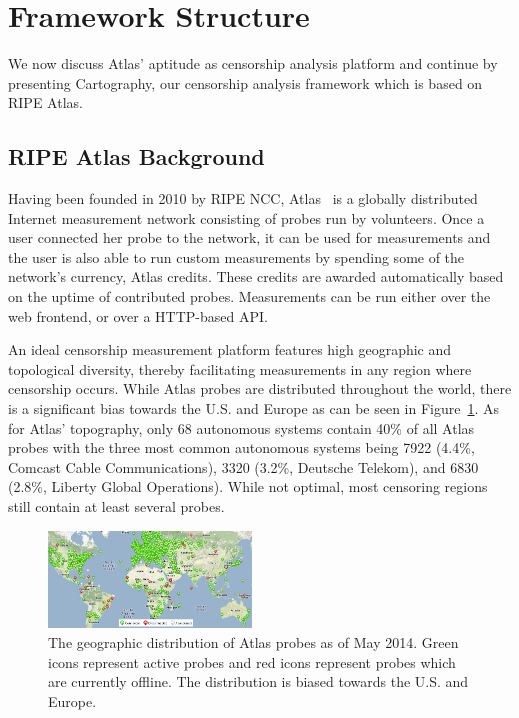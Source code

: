 \section{Framework Structure}
\label{sec:framework}
We now discuss Atlas' aptitude as censorship analysis platform and continue by
presenting \textsf{Cartography}, our censorship analysis framework which is
based on RIPE Atlas.

\subsection{RIPE Atlas Background}
Having been founded in 2010 by RIPE NCC, Atlas~\cite{atlas} is a globally
distributed Internet measurement network consisting of probes run by
volunteers.  Once a user connected her probe to the network, it can be used for
measurements and the user is also able to run custom measurements by spending
some of the network's currency, Atlas credits.  These credits are awarded
automatically based on the uptime of contributed probes.  Measurements can be
run either over the web frontend, or over a HTTP-based API.

An ideal censorship measurement platform features high geographic and
topological diversity, thereby facilitating measurements in any region where
censorship occurs.  While Atlas probes are distributed throughout the world,
there is a significant bias towards the U.S. and Europe as can be seen in
Figure~\ref{fig:probe_distribution}.  As for Atlas' topography, only 68
autonomous systems contain 40\% of all Atlas probes with the three most common
autonomous systems being 7922 (4.4\%, Comcast Cable Communications), 3320
(3.2\%, Deutsche Telekom), and 6830 (2.8\%, Liberty Global Operations).  While
not optimal, most censoring regions still contain at least several probes.

\begin{figure}[t]
\centering
\includegraphics[width=0.48\textwidth]{diagrams/probe_distribution.jpg}
\caption{The geographic distribution of Atlas probes as of May 2014.  Green
icons represent active probes and red icons represent probes which are
currently offline.  The distribution is biased towards the U.S. and Europe.}
\label{fig:probe_distribution}
\end{figure}

